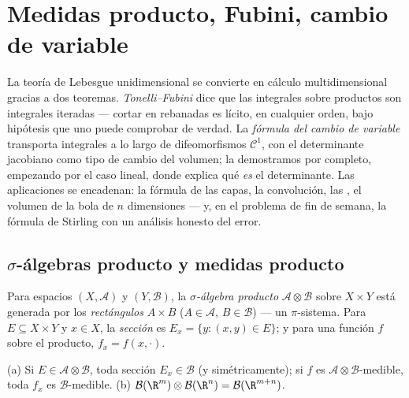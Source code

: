 \chapter{Medidas producto, Fubini, cambio de variable}
\label{ch:b3:product}

La teoría de Lebesgue unidimensional se convierte en cálculo
multidimensional gracias a dos teoremas. \emph{Tonelli--Fubini} dice que
las integrales sobre productos son integrales iteradas --- cortar en
rebanadas es lícito, en cualquier orden, bajo hipótesis que uno puede
comprobar de verdad. La \emph{fórmula del cambio de variable} transporta
integrales a lo largo de difeomorfismos $\mathcal C^1$, con el
determinante jacobiano como tipo de cambio del volumen; la demostramos
por completo, empezando por el caso lineal, donde explica qué \emph{es}
el determinante. Las aplicaciones se encadenan: la fórmula de las capas,
la convolución, las ,
el volumen de la bola de $n$ dimensiones --- y, en el problema de fin de
semana, la fórmula de Stirling con un análisis honesto del error.

\section{$\sigma$-álgebras producto y medidas producto}

\begin{definition}\label{def:b3:product:sigma}
Para espacios 
$(X, \mathcal A)$ y $(Y, \mathcal B)$, la \emph{$\sigma$-álgebra
producto}
$\mathcal A \otimes \mathcal B$ sobre $X \times
Y$ está generada por los \emph{rectángulos} $A \times B$ ($A \in
\mathcal A$, $B \in \mathcal B$) --- un $\pi$-sistema. Para $E
\subseteq X\times Y$ y $x \in X$, la \emph{sección} es $E_x
= \{y : (x,y) \in E\}$; y para una función $f$ sobre el producto,
$f_x = f(x, \cdot)$.
\end{definition}

\begin{proposition}\label{prop:b3:product:sections}
(a) Si $E \in \mathcal A\otimes\mathcal B$, toda sección $E_x
\in \mathcal B$ (y simétricamente); si $f$ es $\mathcal
A\otimes\mathcal B$-medible, toda $f_x$ es $\mathcal
B$-medible.
(b) $\mathcal B(\R^m)\otimes\mathcal B(\R^n) = \mathcal
B(\R^{m+n})$.
\end{proposition}

